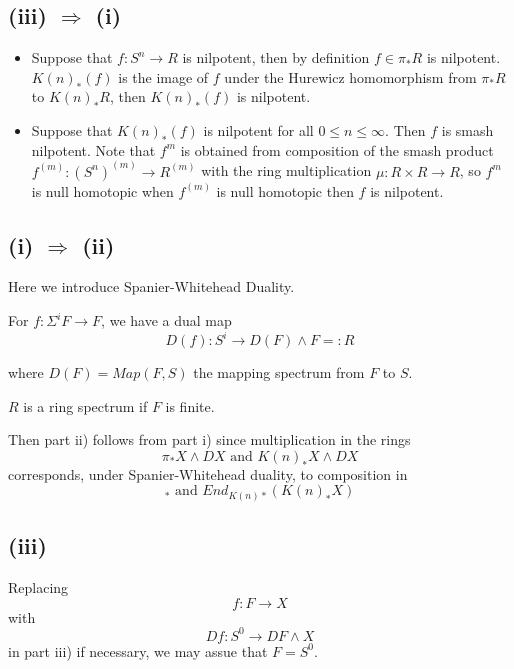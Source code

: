 \documentclass[11pt, oneside]{article}   	%
\theoremstyle{definition}
\begin{document}
\subsection{(iii) $\Rightarrow$ (i)}

\begin{itemize}
	\item Suppose that $f: S^n\to R$ is nilpotent, then by definition $f\in \pi_*R$ is nilpotent. $K(n)_*(f)$ is the image of $f$ under the Hurewicz homomorphism from $\pi_* R$ to $K(n)_*R$, then $K(n)_*(f)$ is nilpotent.
	\item Suppose that $K(n)_*(f)$ is nilpotent for all $0\le n\le\infty$. Then $f$ is smash nilpotent. Note that $f^m$ is obtained from composition of the smash product $f^{(m)}: (S^n)^{(m)}\to R^{(m)}$ with the ring multiplication $\mu: R\times R\to R$, so $f^m$ is null homotopic when $f^{(m)}$ is null homotopic then $f$ is nilpotent.
\end{itemize}

\subsection{(i) $\Rightarrow$ (ii)}

Here we introduce Spanier-Whitehead Duality.

For $f: \Sigma^i F\to F$, we have a dual map
\begin{equation}
	D(f):S^i\to D(F)\wedge F =: R
\end{equation}

where $D(F)=Map(F,S)$ the mapping spectrum from $F$ to $S$.

$R$ is a ring spectrum if $F$ is finite.

Then part ii) follows from part i) since multiplication in the rings
\begin{equation}
	\pi_*X\wedge DX \text{ and }K(n)_*X\wedge DX
\end{equation}
corresponds, under Spanier-Whitehead duality, to composition in
\begin{equation}
	[X,X]_*\text{ and }End_{K(n)*}(K(n)_*X)
\end{equation}

\subsection{(iii)}

Replacing
\begin{equation}
	f:F\to X
\end{equation}
with
\begin{equation}
	Df:S^0\to DF\wedge X
\end{equation}
in part iii) if necessary, we may assue that $F=S^0$. 
\end{document}
